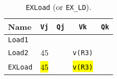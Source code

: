 \begin{enumerate}
    \begin{table}[!htp]
        \centering
        \begin{tabular}{@{} l | c c c c @{}}
            \toprule
            Name            & \texttt{Vj}   & \texttt{Qj}   & \texttt{Vk}           & \texttt{Qk}   \\
            \midrule
            \texttt{Load1}  &               &               &                       &               \\ [.3em]
            \texttt{Load2}  & 45            &               & \texttt{v(R3)}        &               \\
            \cmidrule{1-5}
            \texttt{EXLoad} & \hl{45}       &               & \hl{\texttt{v(R3)}}   &               \\
            \bottomrule
        \end{tabular}
        \caption*{\texttt{EXLoad} (or \texttt{EX\_LD}).}
    \end{table}


\end{enumerate}
